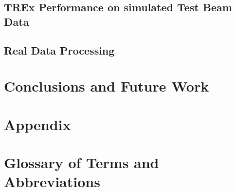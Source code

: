 \documentclass[a4paper, 11pt]{report}
\begin{document}
\section{TREx Performance on simulated Test Beam Data}

\section{Real Data Processing}



\chapter{Conclusions and Future Work}


\chapter*{Appendix}


\chapter*{Glossary of Terms and Abbreviations}




\end{document}
